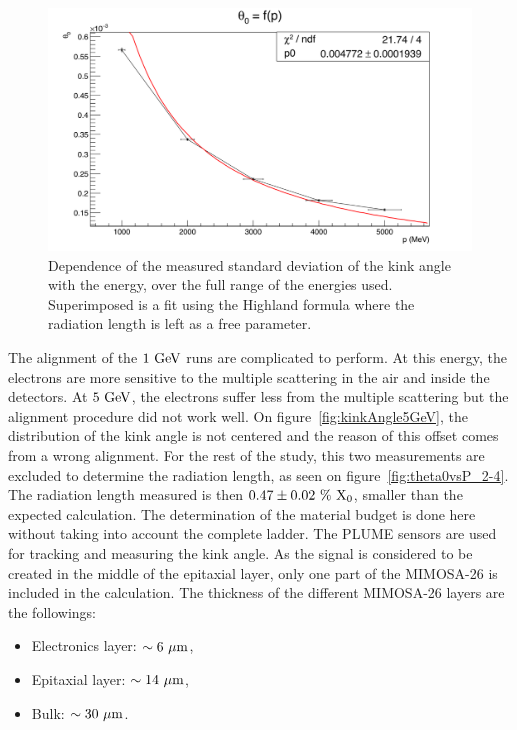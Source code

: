    \begin{figure}[!h]
     \centering
     \includegraphics[width = \textwidth]{Pictures/X0/theta0VsP_all.png}
     \caption{Dependence of the measured standard deviation of the kink angle with the energy, over the full range of the energies used. Superimposed is a fit using the Highland formula where the radiation length is left as a free parameter.}
     \label{fig:theta0vsP_all}
   \end{figure}

   The alignment of the $1~\rm{GeV}$ runs are complicated to perform.
   At this energy, the electrons are more sensitive to the multiple scattering in the air and inside the detectors.
   At $5~\rm{GeV}$, the electrons suffer less from the multiple scattering but the alignment procedure did not work well. 
   On figure~\ref{fig:kinkAngle5GeV}, the distribution of the kink angle is not centered and the reason of this offset comes from a wrong alignment.
   For the rest of the study, this two measurements are excluded to determine the radiation length, as seen on figure~\ref{fig:theta0vsP_2-4}.
   The radiation length measured is then $0.47 \pm 0.02~\%~\rm{X_0}$, smaller than the expected calculation.
   The determination of the material budget is done here without taking into account the complete ladder.
   The \gls{PLUME} sensors are used for tracking and measuring the kink angle.
   As the signal is considered to be created in the middle of the epitaxial layer, only one part of the \gls{MIMOSA}-26 is included in the calculation.
   The thickness of the different \gls{MIMOSA}-26 layers are the followings:
   
   \begin{itemize}
     \item Electronics layer: $\sim 6~\rm{\mu m}$,
     \item Epitaxial layer: $\sim 14~\rm{\mu m}$,
     \item Bulk: $\sim 30~\rm{\mu m}$.
   \end{itemize}

